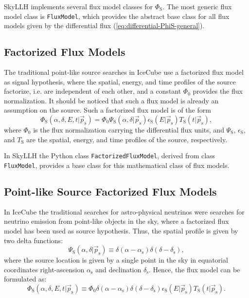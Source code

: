 \documentclass{article}
\newcommand{\code}[1]{\texttt{#1}}
\newcommand{\class}[1]{\colorbox{blue!30}{\code{#1}}}
\newcommand{\ps}{\vec{p}_{\mathrm{s}}}
\begin{document}
SkyLLH implements several flux model classes for $\Phi_{\mathrm{S}}$. The most
generic flux model class is \class{FluxModel}, which provides the abstract base
class for all flux models given by the differential flux
(\ref{eq:differential-PhiS-general}).

\subsection{Factorized Flux Models}
\label{sec:factorized-flux-models}

The traditional point-like source searches in IceCube use a factorized flux
model as signal hypothesis, where the spatial, energy, and time profiles of the
source factorize, i.e. are independent of each other, and a constant $\Phi_0$
provides the flux normalization. It should be noticed that such a
flux model is already an assumption on the source. Such a factorized flux model
is of the form
\begin{equation}
 \Phi_{\mathrm{S}}(\alpha,\delta,E,t|\ps) = \Phi_0 \Psi_{\mathrm{S}}(\alpha,\delta|\ps) \epsilon_{\mathrm{S}}(E|\ps) T_{\mathrm{S}}(t|\ps),
\end{equation}
where $\Phi_0$ is the flux normalization carrying the differential flux units,
and $\Psi_{\mathrm{S}}$, $\epsilon_{\mathrm{S}}$, and $T_{\mathrm{S}}$ are the
spatial, energy, and time profiles of the source, respectively.

In SkyLLH the Python class \class{FactorizedFluxModel}, derived from class
\class{FluxModel}, provides a base class for this mathematical class of flux models.

\subsection{Point-like Source Factorized Flux Models}
\label{sec:point-like-source-factorized-flux-models}

In IceCube the traditional searches for astro-physical neutrinos were searches
for neutrino emission from point-like objects in the sky, where a factorized
flux model has been used as source hypothesis. Thus, the spatial profile is
given by two delta functions:
\begin{equation}
 \Psi_{\mathrm{S}}(\alpha,\delta|\ps) \equiv \delta(\alpha-\alpha_{\mathrm{s}})\delta(\delta-\delta_{\mathrm{s}}),
\end{equation}
where the source location is given by a single point in the sky in
equatorial coordinates right-ascension $\alpha_{\mathrm{s}}$ and declination
$\delta_{\mathrm{s}}$. Hence, the flux model can be formulated as:
\begin{equation}
 \Phi_{\mathrm{S}}(\alpha,\delta,E,t|\ps) \equiv \Phi_0 \delta(\alpha-\alpha_{\mathrm{s}})\delta(\delta-\delta_{\mathrm{s}}) \epsilon_{\mathrm{S}}(E|\ps) T_{\mathrm{S}}(t|\ps).
\end{equation}
\end{document}

